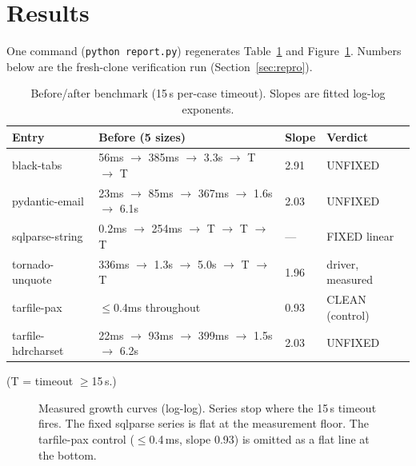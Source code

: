 \documentclass[11pt,a4paper]{article}
\begin{document}
\section{Results}
\label{sec:results}

One command (\verb!python report.py!) regenerates Table~\ref{tab:results} and Figure~\ref{fig:growth}. Numbers below are the fresh-clone verification run (Section~\ref{sec:repro}).

\begin{table}[H]
\centering
\caption{Before/after benchmark (15\,s per-case timeout). Slopes are fitted log-log exponents.}
\label{tab:results}
\begin{tabular}{@{}llll@{}}
\toprule
Entry & Before (5 sizes) & Slope & Verdict \\
\midrule
black-tabs & 56ms $\to$ 385ms $\to$ 3.3s $\to$ T $\to$ T & 2.91 & UNFIXED \\
pydantic-email & 23ms $\to$ 85ms $\to$ 367ms $\to$ 1.6s $\to$ 6.1s & 2.03 & UNFIXED \\
sqlparse-string & 0.2ms $\to$ 254ms $\to$ T $\to$ T $\to$ T & --- & FIXED linear \\
tornado-unquote & 336ms $\to$ 1.3s $\to$ 5.0s $\to$ T $\to$ T & 1.96 & driver, measured \\
tarfile-pax & $\le$0.4ms throughout & 0.93 & CLEAN (control) \\
tarfile-hdrcharset & 22ms $\to$ 93ms $\to$ 399ms $\to$ 1.5s $\to$ 6.2s & 2.03 & UNFIXED \\
\bottomrule
\end{tabular}
\end{table}

(T = timeout $\ge$15\,s.)

\begin{figure}[H]
\centering
{}
\caption{Measured growth curves (log-log). Series stop where the 15\,s timeout fires. The fixed sqlparse series is flat at the measurement floor. The tarfile-pax control ($\le$0.4\,ms, slope 0.93) is omitted as a flat line at the bottom.}
\label{fig:growth}
\end{figure}
\end{document}
